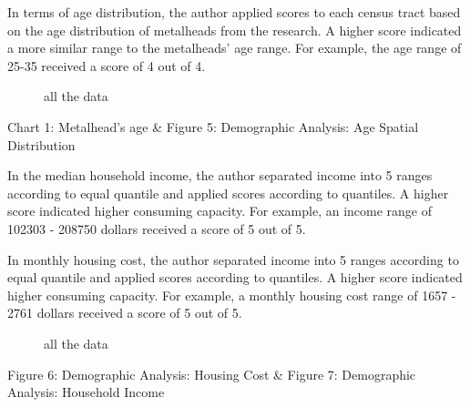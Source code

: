 \documentclass[11pt]{article}
\begin{document}
In terms of age distribution, the author applied scores to each census tract based on the age distribution of metalheads from the research. A higher score indicated a more similar range to the metalheads’ age range. For example, the age range of 25-35 received a score of 4 out of 4.


\begin{figure}[H] 
    \centering
    \hfill%
    \caption{all the data}
\end{figure}

\begin{center}
\centering
Chart 1: Metalhead's age  \& Figure 5: Demographic Analysis: Age Spatial Distribution
\end{center}

In the median household income, the author separated income into 5 ranges according to equal quantile and applied scores according to quantiles. A higher score indicated higher consuming capacity. For example, an income range of 102303 - 208750 dollars received a score of 5 out of 5.

In monthly housing cost, the author separated income into 5 ranges according to equal quantile and applied scores according to quantiles. A higher score indicated higher consuming capacity. For example, a monthly housing cost range of 1657 - 2761 dollars received a score of 5 out of 5.


\begin{figure}[H] 
    \centering
    \hfill%
    \caption{all the data}
\end{figure}

\begin{center}
\centering
Figure 6: Demographic Analysis: Housing Cost \& Figure 7: Demographic Analysis: Household Income
\end{center}
\end{document}
